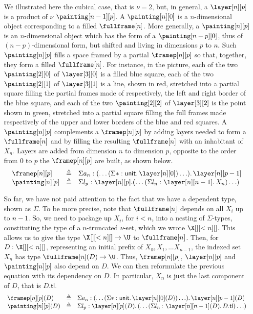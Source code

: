 \documentclass{msc}
\newcommand{\unittype}{\ensuremath{\mathsf{unit}}}
\newcommand{\unitpoint}{\ensuremath{\ast}}
\newcommand{\defeq}{\ensuremath{\triangleq}}
\newcommand{\tl}{\ensuremath{\mathsf{tl}}}
\begin{document}
We illustrated here the cubical case, that is $\nu = 2$, but, in general, a $\layer[n][p]$ is a product of $\nu$ $\painting[n - 1][p]$. A $\painting[n][0]$ is a $n$-dimensional object corresponding to a filled $\fullframe[n]$. More generally, a $\painting[n][p]$ is an $n$-dimensional object which has the form of a $\painting[n-p][0]$, thus of $(n-p)$-dimensional form, but shifted and living in dimensions $p$ to $n$. Such $\painting[n][p]$ fills a space framed by a partial $\framep[n][p]$ so that, together, they form a filled $\fullframe[n]$. For instance, in the picture, each of the two $\painting[2][0]$ of $\layer[3][0]$ is a filled blue square, each of the two $\painting[2][1]$ of $\layer[3][1]$ is a line, shown in red, stretched into a partial square filling the partial frames made of respectively, the left and right border of the blue square, and each of the two $\painting[2][2]$ of $\layer[3][2]$ is the point shown in green, stretched into a partial square filling the full frames made respectively of the upper and lower borders of the blue and red squares. A $\painting[n][p]$ complements a $\framep[n][p]$ by adding layers needed to form a $\fullframe[n]$ and by filling the resulting $\fullframe[n]$ with an inhabitant of $X_n$. Layers are added from dimension $n$ to dimension $p$, opposite to the order from $0$ to $p$ the $\framep[n][p]$ are built, as shown below.
\begin{equation*}
  \begin{array}{lll}
    \framep[n][p]   & \defeq & \Sigma a_n: (\ldots (\Sigma \unitpoint: \unittype .\, \layer[n][0]) \ldots) .\, \layer[n][p - 1] \\
    \painting[n][p] & \defeq & \Sigma l_p: \layer[n][p]. (\ldots (\Sigma l_n: \layer[n][n - 1] .\, X_n) \ldots)
  \end{array}
\end{equation*}

So far, we have not paid attention to the fact that we have a dependent type, shown as $\Sigma$. To be more precise, note that $\fullframe[n]$ depends on all $X_i$ up to $n - 1$. So, we need to package up $X_i$, for $i < n$, into a nesting of $\Sigma$-types, constituting the type of a $n$-truncated $\nu$-set, which we wrote $\X[][<n][]$. This allows us to give the type $\X[][<n][] \rightarrow \U$ to $\fullframe[n]$. Then, for $D: \X[][<n][]$, representing an initial prefix of $X_0, X_1, \ldots X_{n - 1}$, the indexed set $X_n$ has type $\fullframe[n](D) \rightarrow \U$. Thus, $\framep[n][p]$, $\layer[n][p]$ and $\painting[n][p]$ also depend on $D$. We can then reformulate the previous equation with its dependency on $D$. In particular, $X_n$ is just the last component of $D$, that is $D.\tl$.
\begin{equation*}
  \begin{array}{lll}
    \framep[n][p](D)   & \defeq & \Sigma a_n: (\ldots (\Sigma \unitpoint: \unittype.\, \layer[n][0](D)) \ldots) .\,\layer[n][p - 1](D) \\
    \painting[n][p](D) & \defeq & \Sigma l_p: \layer[n][p](D).\, (\ldots (\Sigma l_n: \layer[n][n - 1](D) .\, D.\tl) \ldots)
  \end{array}
\end{equation*}
\end{document}
